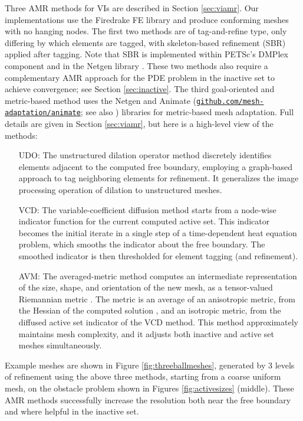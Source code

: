 \documentclass[]{interact}
\theoremstyle{plain}%
\theoremstyle{definition}
\theoremstyle{remark}
\begin{document}
Three AMR methods for VIs are described in Section \ref{sec:viamr}.  Our implementations use the Firedrake FE library \cite{Rathgeberetal2016} and produce conforming meshes with no hanging nodes.  The first two methods are of tag-and-refine type, only differing by which elements are tagged, with skeleton-based refinement (SBR) \cite{PlazaCarey2000} applied after tagging.  Note that SBR is implemented within PETSc's DMPlex component \cite{petsc-user-ref} and in the Netgen library \cite{Betteridgeetal2024}.  These two methods also require a complementary AMR approach for the PDE problem in the inactive set to achieve convergence; see Section \ref{sec:inactive}.  The third goal-oriented and metric-based method uses the Netgen and Animate (\href{https://github.com/mesh-adaptation/animate}{{\small \texttt{github.com/mesh-adaptation/animate}}}; see also \cite{Wallworketal2020}) libraries for metric-based mesh adaptation.  Full details are given in Section \ref{sec:viamr}, but here is a high-level view of the methods:

\begin{itemize}
\item[UDO:] The unstructured dilation operator method discretely identifies elements adjacent to the computed free boundary, employing a graph-based approach to tag neighboring elements for refinement.  It generalizes the image processing operation of dilation \cite{Pratt1991} to unstructured meshes.
\item[VCD:] The variable-coefficient diffusion method starts from a node-wise indicator function for the current computed active set.  This indicator becomes the initial iterate in a single step of a time-dependent heat equation problem, which smooths the indicator about the free boundary.  The smoothed indicator is then thresholded for element tagging (and refinement).
\item[AVM:] The averaged-metric method computes an intermediate representation of the size, shape, and orientation of the new mesh, as a tensor-valued Riemannian metric \cite{Alauzet2010}.  The metric is an average of an anisotropic metric, from the Hessian of the computed solution \cite{Wallworketal2020}, and an isotropic metric, from the diffused active set indicator of the VCD method.  This method approximately maintains mesh complexity, and it adjusts both inactive and active set meshes simultaneously.
\end{itemize}

Example meshes are shown in Figure \ref{fig:threeballmeshes}, generated by 3 levels of refinement using the above three methods, starting from a coarse uniform mesh, on the obstacle problem shown in Figures \ref{fig:activesizes} (middle).  These AMR methods successfully increase the resolution both near the free boundary and where helpful in the inactive set.
\end{document}
